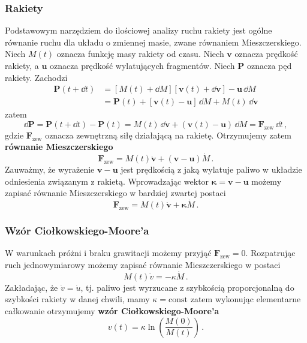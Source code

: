\documentclass[../main.tex]{subfiles}
\begin{document}
\subsubsection{Rakiety}
Podstawowym narzędziem do ilościowej analizy ruchu rakiety jest ogólne równanie ruchu dla układu o zmiennej masie, zwane równaniem Mieszczerskiego. Niech \(M(t)\) oznacza funkcję masy rakiety od czasu. Niech \(\mathbf{v}\) oznacza prędkość rakiety, a \(\mathbf{u}\) oznacza prędkość wylatujących fragmentów. Niech \(\mathbf{P}\) oznacza pęd rakiety. Zachodzi
\begin{equation*}
\begin{split}
    \mathbf{P}(t+\dd t)&=[M(t)+\dd{M}][\mathbf{v}(t)+\dd{\mathbf{v}}]-\mathbf{u}\,\dd M\\
    &=\mathbf{P}(t)+[\mathbf{v}(t)-\mathbf{u}]\,\dd M+M(t)\,\dd{\mathbf{v}}
\end{split}
\end{equation*}
zatem
\begin{equation*}
    \dd\mathbf{P}=\mathbf{P}(t+\dd t)-\mathbf{P}(t)=M(t)\,\dd\mathbf{v}+(\mathbf{v}(t)-\mathbf{u})\,\dd M=\mathbf{F}_\text{zew}\,\dd t\,,
\end{equation*}
gdzie \(\mathbf{F}_\text{zew}\) oznacza zewnętrzną siłę działającą na rakietę. Otrzymujemy zatem \textbf{równanie Mieszczerskiego}
\begin{equation*}
    \mathbf{F}_\text{zew}=M(t)\dot{\mathbf{v}}+(\mathbf{v}-\mathbf{u})\dot M\,.
\end{equation*}
Zauważmy, że wyrażenie \(\mathbf{v}-\mathbf{u}\) jest prędkością z jaką wylatuje paliwo w układzie odniesienia związanym z rakietą. Wprowadzając wektor \(\boldsymbol{\kappa}=\mathbf{v}-\mathbf{u}\) możemy zapisać równanie Mieszczerskiego w bardziej zwartej postaci
\begin{equation*}
    \mathbf{F}_\text{zew}=M(t)\dot{\mathbf{v}}+\boldsymbol{\kappa}\dot M\,.
\end{equation*}
\subsubsection*{Wzór Ciołkowskiego-Moore'a}
W warunkach próżni i braku grawitacji możemy przyjąć \(\mathbf{F}_\text{zew}=0\). Rozpatrując ruch jednowymiarowy możemy zapisać równanie Mieszczerskiego w postaci
\begin{equation*}
    M(t)\dot v=-\kappa \dot M\,.
\end{equation*}
Zakładając, że \(\dot v=\dot u\), tj. paliwo jest wyrzucane z szybkością proporcjonalną do szybkości rakiety w danej chwili, mamy \(\kappa=\text{const}\) zatem wykonując elementarne całkowanie otrzymujemy \textbf{wzór Ciołkowskiego-Moore'a}
\begin{equation*}
    v(t)=\kappa\ln\left(\frac{M(0)}{M(t)}\right)\,.
\end{equation*}
\end{document}
